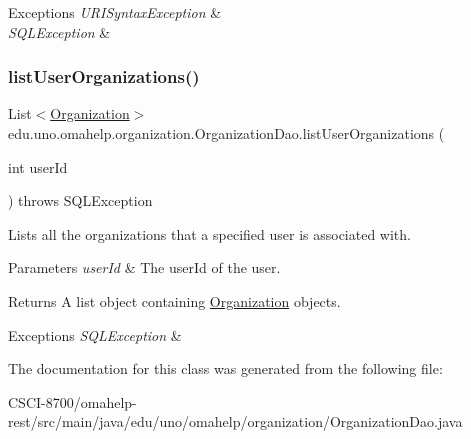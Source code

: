 \begin{DoxyExceptions}{Exceptions}
{\em U\+R\+I\+Syntax\+Exception} & \\
\hline
{\em S\+Q\+L\+Exception} & \\
\hline
\end{DoxyExceptions}
\mbox{\label{classedu_1_1uno_1_1omahelp_1_1organization_1_1_organization_dao_af0fc342f36ca6cde5e8560aded7b6a3f}} 
\subsubsection{\texorpdfstring{list\+User\+Organizations()}{listUserOrganizations()}}
{\footnotesize\ttfamily List$<$\mbox{\hyperlink{classedu_1_1uno_1_1omahelp_1_1organization_1_1_organization}{Organization}}$>$ edu.\+uno.\+omahelp.\+organization.\+Organization\+Dao.\+list\+User\+Organizations (\begin{DoxyParamCaption}\item[{int}]{user\+Id }\end{DoxyParamCaption}) throws S\+Q\+L\+Exception}

Lists all the organizations that a specified user is associated with.


\begin{DoxyParams}{Parameters}
{\em user\+Id} & The user\+Id of the user. \\
\hline
\end{DoxyParams}
\begin{DoxyReturn}{Returns}
A list object containing \mbox{\hyperlink{classedu_1_1uno_1_1omahelp_1_1organization_1_1_organization}{Organization}} objects. 
\end{DoxyReturn}

\begin{DoxyExceptions}{Exceptions}
{\em S\+Q\+L\+Exception} & \\
\hline
\end{DoxyExceptions}


The documentation for this class was generated from the following file\+:\begin{DoxyCompactItemize}
\item 
C\+S\+C\+I-\/8700/omahelp-\/rest/src/main/java/edu/uno/omahelp/organization/Organization\+Dao.\+java\end{DoxyCompactItemize}
